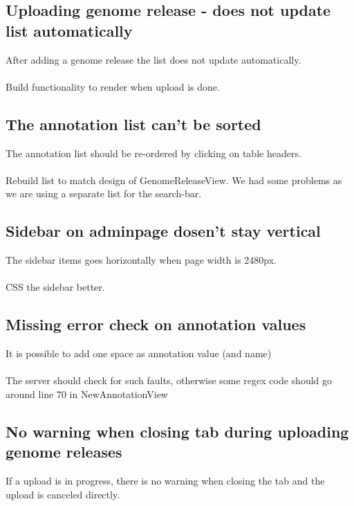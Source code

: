 \subsection{Uploading genome release - does not update list automatically}
After adding a genome release the list does not update automatically. \\
\\
Build functionality to render when upload is done. 
\subsection{The annotation list can't be sorted}
The annotation list should be re-ordered by clicking on table headers. \\
\\
Rebuild list to match design of GenomeReleaseView. We had some problems as we are using a separate list for the search-bar.
\subsection{Sidebar on adminpage dosen't stay vertical}
The sidebar items goes horizontally when page width is 2480px. \\
\\
CSS the sidebar better. 
\subsection{Missing error check on annotation values}
It is possible to add one space as annotation value (and name) \\
\\
The server should check for such faults, otherwise some regex code should go around line 70 in NewAnnotationView
\subsection{No warning when closing tab during uploading genome releases}
If a upload is in progress, there is no warning when closing the tab and the upload is canceled directly. \\
\\
